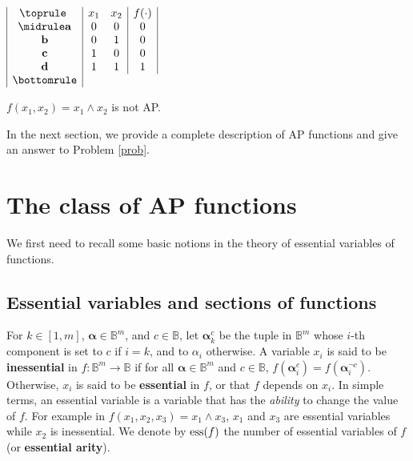 \begin{table}[ht]
$\begin{array}{|c|cc|c|}
  \toprule
  ~ & x_1 & x_2 & f(\cdot) \\
  \midrule
  \mathbf{a} & 0 & 0 & 0\\
  \mathbf{b} & 0 & 1 & 0\\
  \mathbf{c} & 1 & 0 & 0\\
  \mathbf{d} & 1 & 1 & 1\\
  \bottomrule
\end{array}
$\bigskip
\caption{$f(x_1,x_2)= x_1 \wedge x_2$ is not AP.}
\label{exampleNotAP}
\end{table}

In the next section, we provide a complete description of AP functions and give
an answer to Problem \ref{prob}.

\section{The class of AP functions}
\label{class_of_ap_functions}

We first need to recall some basic notions in the theory of essential variables
of functions.

\subsection{Essential variables and sections of functions}

For $k\in [1,m]$, $\boldsymbol{\alpha}\in \mathbb{B}^m$, and $c \in
\mathbb{B}$, let ${\boldsymbol{\alpha}}_{k}^c$ be the tuple in $\mathbb{B}^{m}$
whose $i$-th component is set to $c$ if $i=k$, and to $\alpha_i$ otherwise.  A
variable $x_i$ is said to be \textbf{inessential} in $f\colon \mathbb{B}^m\to
\mathbb{B}$ if for all $\boldsymbol{\alpha} \in \mathbb{B}^m$ and $c \in
\mathbb{B}$, $f(\boldsymbol{\alpha}^c_i) = f(\boldsymbol{\alpha}^{\neg c}_i)$.
Otherwise, $x_i$ is said to be \textbf{essential} in $f$, or that $f$ depends
on $x_i$. In simple terms, an
essential variable is a variable that has the \textit{ability} to change the
value of $f$. For example in $f(x_1, x_2, x_3) = x_1 \wedge x_3$, $x_1$ and
$x_3$ are essential variables while $x_2$ is inessential.  We denote by
$\operatorname{ess}(f)$ the number of essential variables of $f$ (or \textbf{essential
arity}).

